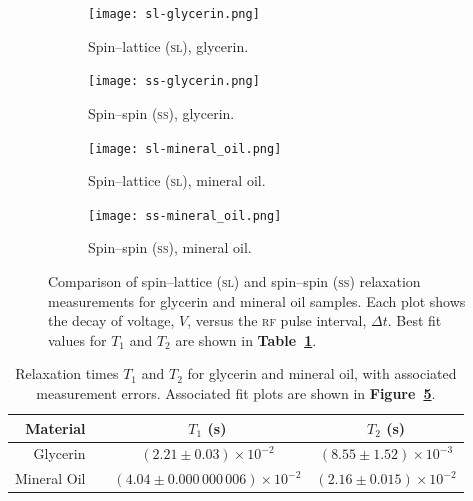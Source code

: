 \documentclass[12pt]{report}
\begin{document}
\begin{figure}[tbh]
    \centering
    \begin{subfigure}{0.45\textwidth}
        \centering
        \texttt{[image: sl-glycerin.png]}
        \caption{Spin–lattice (\textsc{sl}), glycerin.}
        \label{fig:sl-glycerin}
    \end{subfigure}
    \hspace{0.02\textwidth} %
    \begin{subfigure}{0.45\textwidth}
        \centering
        \texttt{[image: ss-glycerin.png]}
        \caption{Spin–spin (\textsc{ss}), glycerin.}
        \label{fig:ss-glycerin}
    \end{subfigure}
    
    \vspace{\baselineskip} %
    
    \begin{subfigure}{0.45\textwidth}
        \centering
        \texttt{[image: sl-mineral\_oil.png]}
        \caption{Spin–lattice (\textsc{sl}), mineral oil.}
        \label{fig:sl-mineral-oil}
    \end{subfigure}
    \hspace{0.02\textwidth} %
    \begin{subfigure}{0.45\textwidth}
        \centering
        \texttt{[image: ss-mineral\_oil.png]}
        \caption{Spin–spin (\textsc{ss}), mineral oil.}
        \label{fig:ss-mineral-oil}
    \end{subfigure}
    
    \caption{Comparison of spin–lattice (\textsc{sl}) and spin–spin (\textsc{ss}) relaxation measurements for glycerin and mineral oil samples. Each plot shows the decay of voltage, $V$, versus the \textsc{rf} pulse interval, $\Delta t$. Best fit values for $T_1$ and $T_2$ are shown in \textbf{Table~\ref{tab:relaxation-times}}.}
    \label{fig:fit-plots}
\end{figure}

\begin{table}[tbh]
    \centering
    \begin{tabular}{rccc}
         \textbf{Material}   && $T_1$ (s) & $T_2$ (s) \\ \hline
        Glycerin    && $(2.21 \pm 0.03) \times 10^{-2}$ & $(8.55 \pm 1.52) \times 10^{-3}$ \\
        Mineral Oil && $(4.04 \pm 0.000\,000\,006) \times 10^{-2}$ & $(2.16 \pm 0.015) \times 10^{-2}$ \\
    \end{tabular}
    \caption{Relaxation times $T_1$ and $T_2$ for glycerin and mineral oil, with associated measurement errors. Associated fit plots are shown in \textbf{Figure~\ref{fig:fit-plots}}.}
    \label{tab:relaxation-times}
\end{table}
\end{document}
